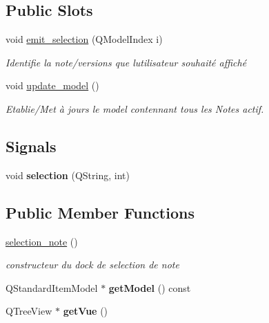 \subsection*{Public Slots}
\begin{DoxyCompactItemize}
\item 
void \hyperlink{classselection__note_a70f407c89a87e5d8ce992f18ef64773d}{emit\+\_\+selection} (Q\+Model\+Index i)
\begin{DoxyCompactList}\small\item\em Identifie la note/versions que l\textquotesingle{}utilisateur souhaité affiché \end{DoxyCompactList}\item 
void \hyperlink{classselection__note_aab004424eba4264628d2e01108f2e63b}{update\+\_\+model} ()
\begin{DoxyCompactList}\small\item\em Etablie/\+Met à jours le model contennant tous les Notes actif. \end{DoxyCompactList}\end{DoxyCompactItemize}
\subsection*{Signals}
\begin{DoxyCompactItemize}
\item 
\mbox{\label{classselection__note_ae1cc0e50817dcb45975fa33c9231ef0b}} 
void {\bfseries selection} (Q\+String, int)
\end{DoxyCompactItemize}
\subsection*{Public Member Functions}
\begin{DoxyCompactItemize}
\item 
\mbox{\label{classselection__note_a69a11fa0461c0c103f099e894bf0b399}} 
\hyperlink{classselection__note_a69a11fa0461c0c103f099e894bf0b399}{selection\+\_\+note} ()
\begin{DoxyCompactList}\small\item\em constructeur du dock de selection de note \end{DoxyCompactList}\item 
\mbox{\label{classselection__note_a87ea63b64611ba8668ab50affd116aea}} 
Q\+Standard\+Item\+Model $\ast$ {\bfseries get\+Model} () const
\item 
\mbox{\label{classselection__note_aa4468145cd30e1fab18f3f7c2b5437aa}} 
Q\+Tree\+View $\ast$ {\bfseries get\+Vue} ()
\end{DoxyCompactItemize}


